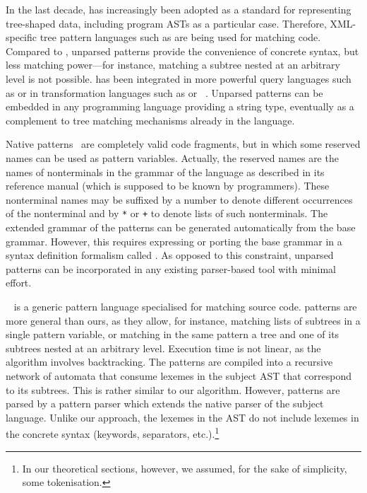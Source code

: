 In the last decade, \XML has increasingly been adopted as a standard
for representing tree\hyp{}shaped data, including program ASTs as a
particular case. Therefore, \textsf{XML}\hyp{}specific tree pattern
languages such as \XPath are being used for matching code. Compared to
\XPath, unparsed patterns provide the convenience of concrete syntax,
but less matching power---for instance, matching a subtree nested at
an arbitrary level is not possible. \XPath has been integrated in more
powerful query languages such as \XQuery or in transformation
languages such as \XSLT or \CDuce~\cite{cduce}. Unparsed patterns can
be embedded in any programming language providing a string type,
eventually as a complement to tree matching mechanisms already in the
language.

Native patterns~\cite{native} are completely valid code fragments, but
in which some reserved names can be used as pattern
variables. Actually, the reserved names are the names of
non\-terminals in the grammar of the language as described in its
reference manual (which is supposed to be known by programmers). These
non\-terminal names may be suffixed by a number to denote different
occurrences of the nonterminal and by \texttt{*} or \texttt{+} to
denote lists of such nonterminals. The extended grammar of the
patterns can be generated automatically from the base
grammar. However, this requires expressing or porting the base grammar
in a syntax definition formalism called \SDF. As opposed to this
constraint, unparsed patterns can be incorporated in any existing
parser\hyp{}based tool with minimal effort.

\Scruple~\cite{scruple} is a generic pattern language specialised for
matching source code. \Scruple patterns are more general than ours, as
they allow, for instance, matching lists of subtrees in a single
pattern variable, or matching in the same pattern a tree and one of
its subtrees nested at an arbitrary level. Execution time is not
linear, as the algorithm involves backtracking. The patterns are
compiled into a recursive network of automata that consume lexemes in
the subject AST that correspond to its subtrees. This is rather
similar to our algorithm. However, \Scruple patterns are parsed by a
pattern parser which extends the native parser of the subject
language. Unlike our approach, the lexemes in the AST do not include
lexemes in the concrete syntax (keywords, separators,
etc.).\footnote{In our theoretical sections, however, we assumed, for
the sake of simplicity, some tokenisation.}

